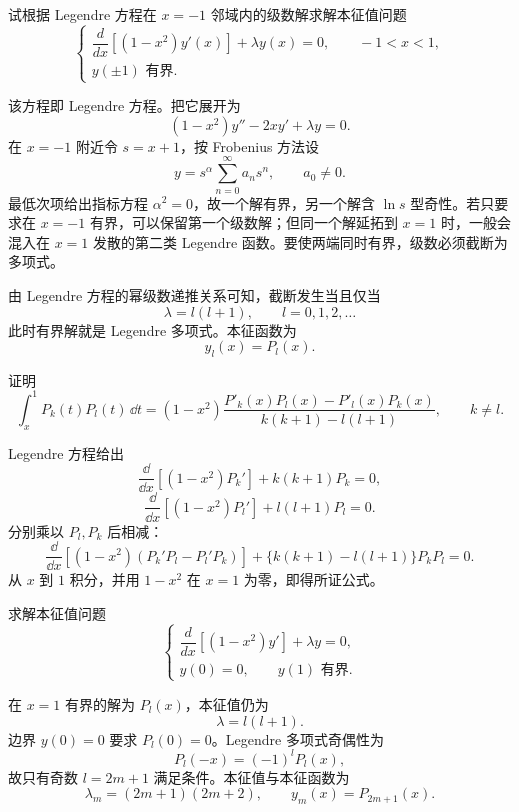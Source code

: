 ﻿


\begin{question}
试根据 Legendre 方程在 \(x=-1\) 邻域内的级数解求解本征值问题
\[
\begin{cases}
\dfrac d{dx}\left[(1-x^2)y'(x)\right]+\lambda y(x)=0,\qquad -1<x<1,\\
y(\pm1)\text{ 有界}.
\end{cases}
\]
\begin{solution}
该方程即 Legendre 方程。把它展开为
\[
(1-x^2)y''-2xy'+\lambda y=0.
\]
在 \(x=-1\) 附近令 \(s=x+1\)，按 Frobenius 方法设
\[
y=s^\alpha\sum_{n=0}^{\infty}a_ns^n,\qquad a_0\ne0.
\]
最低次项给出指标方程 \(\alpha^2=0\)，故一个解有界，另一个解含 \(\ln s\) 型奇性。若只要求在 \(x=-1\) 有界，可以保留第一个级数解；但同一个解延拓到 \(x=1\) 时，一般会混入在 \(x=1\) 发散的第二类 Legendre 函数。要使两端同时有界，级数必须截断为多项式。

由 Legendre 方程的幂级数递推关系可知，截断发生当且仅当
\[
\lambda=l(l+1),\qquad l=0,1,2,\ldots
\]
此时有界解就是 Legendre 多项式。本征函数为
\[
y_l(x)=P_l(x).
\]
\end{solution}
\end{question}

\begin{question}
证明
\[
\int_x^1P_k(t)P_l(t)\,\dd{t}
=(1-x^2)\frac{P'_k(x)P_l(x)-P'_l(x)P_k(x)}{k(k+1)-l(l+1)},\qquad k\ne l.
\]
\begin{solution}
Legendre 方程给出
\[
\frac{\dd}{\dd{x}}\left[(1-x^2)P_k'\right]+k(k+1)P_k=0,
\]
\[
\frac{\dd}{\dd{x}}\left[(1-x^2)P_l'\right]+l(l+1)P_l=0.
\]
分别乘以 \(P_l,P_k\) 后相减：
\[
\frac{\dd}{\dd{x}}\left[(1-x^2)(P_k'P_l-P_l'P_k)\right]
+\{k(k+1)-l(l+1)\}P_kP_l=0.
\]
从 \(x\) 到 \(1\) 积分，并用 \(1-x^2\) 在 \(x=1\) 为零，即得所证公式。
\end{solution}
\end{question}

\begin{question}
求解本征值问题
\[
\begin{cases}
\dfrac d{dx}\left[(1-x^2)y'\right]+\lambda y=0,\\
y(0)=0,\qquad y(1)\text{ 有界}.
\end{cases}
\]
\begin{solution}
在 \(x=1\) 有界的解为 \(P_l(x)\)，本征值仍为
\[
\lambda=l(l+1).
\]
边界 \(y(0)=0\) 要求 \(P_l(0)=0\)。Legendre 多项式奇偶性为
\[
P_l(-x)=(-1)^lP_l(x),
\]
故只有奇数 \(l=2m+1\) 满足条件。本征值与本征函数为
\[
\lambda_m=(2m+1)(2m+2),\qquad y_m(x)=P_{2m+1}(x).
\]
\end{solution}
\end{question}


